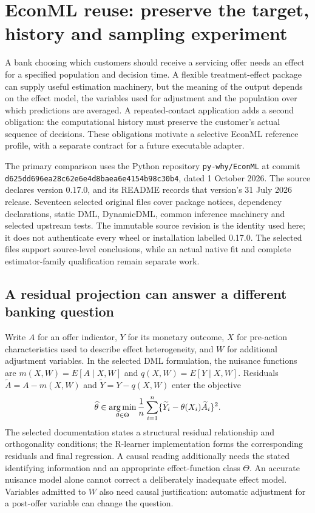 \section{EconML reuse: preserve the target, history and sampling experiment}
\label{exec19:econml-scope}

A bank choosing which customers should receive a servicing offer needs an
effect for a specified population and decision time. A flexible treatment-effect
package can supply useful estimation machinery, but the meaning of the output
depends on the effect model, the variables used for adjustment and the population
over which predictions are averaged. A repeated-contact application adds a
second obligation: the computational history must preserve the customer's
actual sequence of decisions. These obligations motivate a selective EconML
reference profile, with a separate contract for a future executable adapter.

The primary comparison uses the Python repository \texttt{py-why/EconML} at
commit \texttt{d625dd696ea28c62e6e4d8baea6e4154b98c30b4}, dated 1 October
2026. The source declares version 0.17.0, and its README records that version's
31 July 2026 release. Seventeen selected original files cover package notices,
dependency declarations, static DML, DynamicDML, common inference machinery
and selected upstream tests. The immutable source revision is the identity
used here; it does not authenticate every wheel or installation labelled
0.17.0. The selected files support source-level conclusions, while an actual
native fit and complete estimator-family qualification remain separate work.
\citep{exec19_econml_source}

\subsection{A residual projection can answer a different banking question}
\label{exec19:econml-target}

Write $A$ for an offer indicator, $Y$ for its monetary outcome, $X$ for
pre-action characteristics used to describe effect heterogeneity, and $W$ for
additional adjustment variables. In the selected DML formulation, the nuisance
functions are $m(X,W)=E[A\mid X,W]$ and $q(X,W)=E[Y\mid X,W]$.
Residuals $\widetilde A=A-m(X,W)$ and
$\widetilde Y=Y-q(X,W)$ enter the objective
\begin{equation}
 \widehat\theta\in\mathop{\rm arg\,min}_{\theta\in\Theta}
 \frac{1}{n}\sum_{i=1}^n
 \{\widetilde Y_i-\theta(X_i)\widetilde A_i\}^{2}.
 \label{exec19:econml-objective}
\end{equation}
The selected documentation states a structural residual relationship and
orthogonality conditions; the R-learner implementation forms the corresponding
residuals and final regression. A causal reading additionally needs the stated
identifying information and an appropriate effect-function class $\Theta$.
An accurate nuisance model alone cannot correct a deliberately inadequate
effect model. Variables admitted to $W$ also need causal justification:
automatic adjustment for a post-offer variable can change the question.
\citep{exec19_econml_source}

